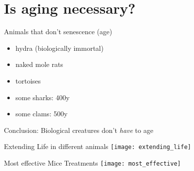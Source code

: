 \section{Is aging necessary?}


\begin{frame}[c]{Animals that don't senescence (age)}
    \large
    \begin{itemize}[<+(1)->]
        \item hydra (biologically immortal) \cite{martinez1998mortality}
        \item naked mole rats \cite{ruby2018naked}
        \item tortoises \cite{miller2001escaping}
        \item some sharks: 400y \cite{Greenlan67:online}
        \item some clams: 500y \cite{munro2012extreme}
    \end{itemize}
    \pause
    Conclusion: Biological creatures don't {\em have} to age
\end{frame}



\begin{frame}[c]{Extending Life in different animals}
    \texttt{[image: extending\_life]} \\
    \cite{bulterijs2015time}
\end{frame}


\begin{frame}[c]{Most effective Mice Treatments}
    \texttt{[image: most\_effective]} \\
    \cite{Geroscie32:online}
\end{frame}
